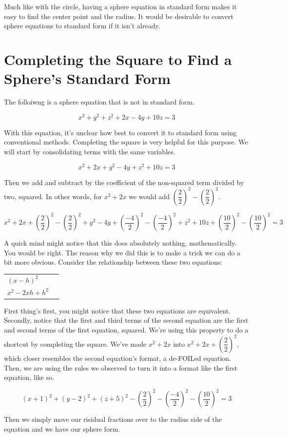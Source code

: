 \documentclass{article}
\begin{document}
Much like with the circle, having a sphere equation in standard form makes it
easy to find the center point and the radius. It would be desirable to convert
sphere equations to standard form if it isn't already.

\section{Completing the Square to Find a Sphere's Standard Form}
The folloiwng is a sphere equation that is not in standard form.

$$x^2 + y^2 + z^2 + 2x - 4y + 10z = 3$$

With this equation, it's unclear how best to convert it to standard form using
conventional methods. Completing the square is very helpful for this purpose.
We will start by consolidating terms with the same variables.

$$x^2 + 2x + y^2 - 4y + z^2 + 10z = 3$$

Then we add and subtract by the coefficient of the non-squared term divided by
two, squared. In other words, for $x^2 + 2x$ we would add
$(\dfrac{2}{2})^2 - (\dfrac{2}{2})^2$.

$$x^2 + 2x + (\dfrac{2}{2})^2 - (\dfrac{2}{2})^2 + y^2 - 4y + (\dfrac{-4}{2})^2 - (\dfrac{-4}{2})^2 + z^2 + 10z + (\dfrac{10}{2})^2 - (\dfrac{10}{2})^2 = 3$$

A quick mind might notice that this does absolutely nothing, mathematically.
You would be right. The reason why we did this is to make a trick we can do a
bit more obvious. Consider the relationship between these two equations:

\begin{tabular}{ l r }
	$(x - h)^2$ \\
	$x^2 - 2xh + h^2$ \\
\end{tabular}

First thing's first, you might notice that these two equations are equivalent.
Secondly, notice that the first and third terms of the second equation are the
first and second terms of the first equation, squared. We're using this
property to do a shortcut by completing the square. We've made $x^2 + 2x$ into
$x^2 + 2x + (\dfrac{2}{2})^2$, which closer resembles the second equation's
format, a de-FOILed equation. Then, we are using the rules we observed to turn
it into a format like the first equation, like so.

$$(x + 1)^2 + (y - 2)^2 + (z + 5)^2 - (\dfrac{2}{2})^2 - (\dfrac{-4}{2})^2 - (\dfrac{10}{2})^2 = 3$$

Then we simply move our risidual fractions over to the radius side of the
equation and we have our sphere form.
\end{document}
